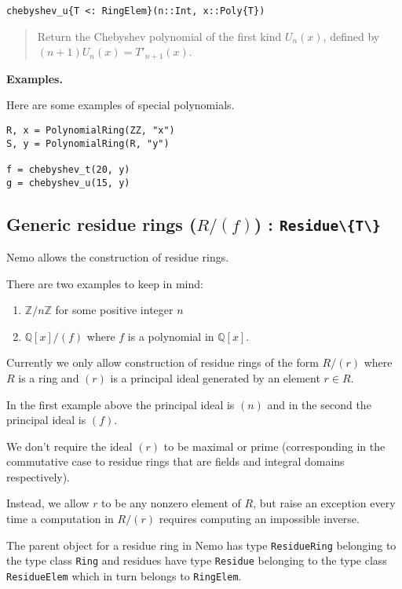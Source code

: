 \documentclass[a4paper,10pt]{article}
\newcommand{\Z}{\mathbb{Z}}
\newcommand{\Q}{\mathbb{Q}}
\newcommand{\code}{\lstinline}
\newcommand{\desc}[1]{\vspace{-3mm}\begin{quote}#1\end{quote}}
\begin{document}
\begin{lstlisting}
chebyshev_u{T <: RingElem}(n::Int, x::Poly{T})
\end{lstlisting}

\desc{Return the Chebyshev polynomial of the first kind $U_n(x)$, defined by 
$(n+1) U_n(x) = T'_{n+1}(x)$.}

\textbf{Examples.}

Here are some examples of special polynomials.

\begin{lstlisting}
R, x = PolynomialRing(ZZ, "x")
S, y = PolynomialRing(R, "y")

f = chebyshev_t(20, y)
g = chebyshev_u(15, y)
\end{lstlisting}

\subsection{Generic residue rings ($R/(f)$) : \code|Residue\{T\}|}

Nemo allows the construction of residue rings. 

There are two examples to keep in mind:

\begin{enumerate}
\item $\Z/n\Z$ for some positive integer $n$

\item $\Q[x]/(f)$ where $f$ is a polynomial in $\Q[x]$.
\end{enumerate}

Currently we only allow construction of residue rings of the form $R/(r)$ where
$R$ is a ring and $(r)$ is a principal ideal generated by an element $r \in R$. 

In the first example above the principal ideal is $(n)$ and in the second the principal
ideal is $(f)$.

We don't require the ideal $(r)$ to be maximal or prime (corresponding in the
commutative case to residue rings that are fields and integral domains 
respectively). 

Instead, we allow $r$ to be any nonzero element of $R$, but raise an exception
every time a computation in $R/(r)$ requires computing an impossible inverse.

The parent object for a residue ring in Nemo has type \code{ResidueRing} belonging
to the type class \code{Ring} and residues have type \code{Residue} belonging to
the type class \code{ResidueElem} which in turn belongs to \code{RingElem}. 
\end{document}

